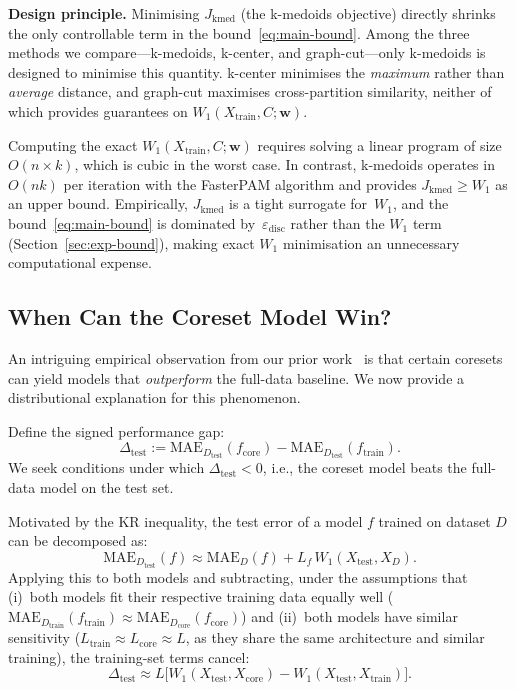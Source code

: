 \documentclass[journal]{IEEEtran}
\newcommand{\MAE}{\mathrm{MAE}}
\newcommand{\Wone}{W_1}
\newcommand{\Xtrain}{X_{\mathrm{train}}}
\newcommand{\Xtest}{X_{\mathrm{test}}}
\newcommand{\Xcore}{X_{\mathrm{core}}}
\newcommand{\Dtrain}{D_{\mathrm{train}}}
\newcommand{\Dtest}{D_{\mathrm{test}}}
\newcommand{\Dcore}{D_{\mathrm{core}}}
\newcommand{\ftrain}{f_{\mathrm{train}}}
\newcommand{\fcore}{f_{\mathrm{core}}}
\newcommand{\Ltrain}{L_{\mathrm{train}}}
\newcommand{\Lcore}{L_{\mathrm{core}}}
\newcommand{\edisc}{\varepsilon_{\mathrm{disc}}}
\newcommand{\Jkmed}{J_{\mathrm{kmed}}}
\begin{document}
\textbf{Design principle.}
Minimising $\Jkmed$ (the k-medoids objective) directly shrinks the
only controllable term in the bound~\eqref{eq:main-bound}.
Among the three methods we compare---k-medoids, k-center, and
graph-cut---only k-medoids is designed to minimise this quantity.
k-center minimises the \emph{maximum} rather than \emph{average}
distance, and graph-cut maximises cross-partition similarity, neither
of which provides guarantees on $\Wone(\Xtrain, C; \mathbf{w})$.

\begin{remark}[Why not minimise $\Wone$ directly?]
\label{rem:w1-direct}
Computing the exact $\Wone(\Xtrain, C; \mathbf{w})$ requires solving
a linear program of size $O(n \times k)$, which is cubic in the
worst case.
In contrast, k-medoids operates in $O(nk)$ per iteration with
the FasterPAM algorithm and provides $\Jkmed \ge \Wone$ as an upper
bound.
Empirically, $\Jkmed$ is a tight surrogate for~$\Wone$, and the
bound~\eqref{eq:main-bound} is dominated by~$\edisc$ rather than
the $\Wone$ term (Section~\ref{sec:exp-bound}), making exact
$\Wone$ minimisation an unnecessary computational expense.
\end{remark}


\subsection{When Can the Coreset Model Win?}
\label{sec:theory-win}

An intriguing empirical observation from our prior
work~\cite{our_itsc} is that certain coresets can yield models that
\emph{outperform} the full-data baseline.
We now provide a distributional explanation for this phenomenon.

Define the signed performance gap:
\begin{equation}
  \Delta_{\mathrm{test}} :=
    \MAE_{\Dtest}(\fcore) - \MAE_{\Dtest}(\ftrain).
\end{equation}
We seek conditions under which $\Delta_{\mathrm{test}} < 0$, i.e.,
the coreset model beats the full-data model on the test set.

Motivated by the KR inequality, the test error of a model $f$
trained on dataset $D$ can be decomposed as:
\begin{equation}
  \MAE_{\Dtest}(f)
  \approx \MAE_D(f) + L_f \, \Wone(\Xtest, X_D).
\end{equation}
Applying this to both models and subtracting, under the assumptions
that
(i)~both models fit their respective training data equally well
($\MAE_{\Dtrain}(\ftrain) \approx \MAE_{\Dcore}(\fcore)$) and
(ii)~both models have similar sensitivity
($\Ltrain \approx \Lcore \approx L$, as they share the same
architecture and similar training), the training-set terms cancel:
\begin{equation}\label{eq:delta-approx}
\boxed{
  \Delta_{\mathrm{test}}
  \approx L \bigl[
    \Wone(\Xtest, \Xcore) - \Wone(\Xtest, \Xtrain)
  \bigr].
}
\end{equation}
\end{document}
